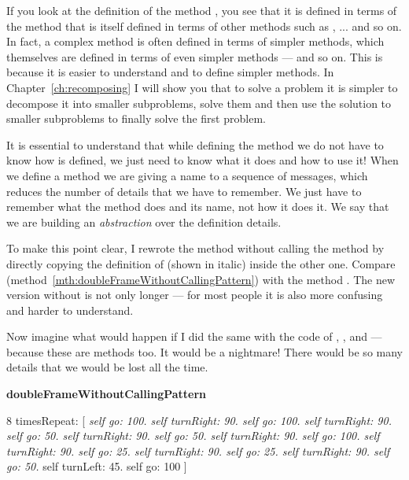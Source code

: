 If you look at the definition of the method , you see that it is defined in terms of the  method that is itself defined in terms of other methods such as \go, \turnLeft ... and so on. In fact, a complex method is often defined in terms of simpler methods, which themselves are defined in terms of even simpler methods --- and so on. This is because it is easier to understand and to define simpler methods.  In Chapter~\ref{ch:recomposing} I will show you that to solve a problem it is simpler to decompose it into smaller subproblems, solve them and then use the solution to smaller subproblems to finally solve the first problem. 

It is essential to understand that while defining the method  we do not have to know how  is defined, we just need to know what it does and how to use it!  When we define a method we are giving a name to a sequence of messages, which reduces the number of details that we have to remember.  We just have to remember what the method does and its name, not how it does it.  We say that we are building an \emph{abstraction} over the definition details.

To make this point clear, I rewrote the method  without calling the method  by directly copying the definition of  (shown in italic) inside the other one. Compare  (method~\ref{mth:doubleFrameWithoutCallingPattern}) with the method . The new version without  is not only longer --- for most people it is also more confusing and harder to understand. 

Now imagine what would happen if I did the same with the code of \turnRight, \turnLeft, and \go --- because these are methods too. It would be a nightmare! There would be so many details that we would be lost all the time. 

\begin{method}\label{mth:doubleFrameWithoutCallingPattern}
\textbf{doubleFrameWithoutCallingPattern}

   8 timesRepeat: 
                  [ \textit{self go: 100.
                  self turnRight: 90.
                  self go: 100.
                  self turnRight: 90.
                  self go: 50.
                  self turnRight: 90.
                  self go: 50.
                  self turnRight: 90.
                  self go: 100.
                  self turnRight: 90.
                  self go: 25.
                  self turnRight: 90.
                  self go: 25.
                  self turnRight: 90.
                  self go: 50.}
                  self turnLeft: 45. 
                  self go: 100 ]
\end{method}



